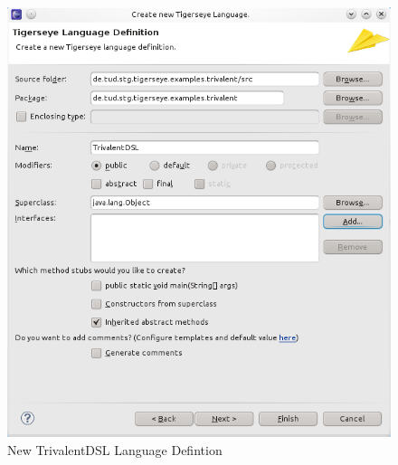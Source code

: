 \documentclass[article,colorback,accentcolor=tud4c]{tudreport}
\begin{document}
	\begin{figure}
	  \centering
	  \includegraphics[scale=.5,keepaspectratio=true]{./pics/example_newlang_newlangclass.png}
	  \caption{New TrivalentDSL Language Defintion}\label{fig:example_newlang_newlangclass}
	\end{figure}
\end{document}
